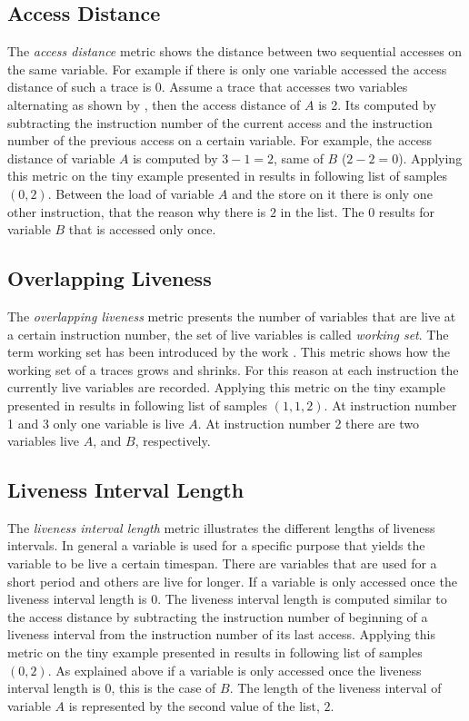 \documentclass[onecolumn, openright, master, english, signatures]{dbrgrptt}
\begin{document}
\subsection{Access Distance}\label{ssec:metric-access-distance}
The \emph{access distance} metric shows the distance between two sequential accesses on the same variable.
For example if there is only one variable accessed the access distance of such a \ac{trace} is 0.
Assume a \ac{trace} that accesses two variables alternating as shown by , then the access distance of $A$ is 2.
Its computed by subtracting the instruction number of the current access and the instruction number of the previous access on a certain variable.
For example, the access distance of variable $A$ is computed by $3-1 = 2$, same of $B$ ($2 - 2 = 0$).
Applying this metric on the tiny example presented in  results in following list of samples $(0, 2)$.
Between the load of variable $A$ and the store on it there is only one other instruction, that the reason why there is $2$ in the list.
The $0$ results for variable $B$ that is accessed only once.

\subsection{Overlapping Liveness}\label{ssec:metric-concurrently-live}
The \emph{overlapping liveness} metric presents the number of variables that are live at a certain instruction number, the set of live variables is called \emph{working set}.
The term working set has been introduced by the work \cite{denning1968working}.
This metric shows how the working set of a \ac{trace}s grows and shrinks.
For this reason at each instruction the currently live variables are recorded.
Applying this metric on the tiny example presented in  results in following list of samples $(1, 1, 2)$.
At instruction number 1 and 3 only one variable is live $A$.
At instruction number 2 there are two variables live $A$, and $B$, respectively.

\subsection{Liveness Interval Length}\label{ssec:metric-liveness-interval-length}
The \emph{liveness interval length} metric illustrates the different lengths of liveness intervals.
In general a variable is used for a specific purpose that yields the variable to be live a certain timespan.
There are variables that are used for a short period and others are live for longer.
If a variable is only accessed once the liveness interval length is $0$.
The liveness interval length is computed similar to the access distance by subtracting the instruction number of beginning of a liveness interval from the instruction number of its last access.
Applying this metric on the tiny example presented in  results in following list of samples $(0, 2)$.
As explained above if a variable is only accessed once the liveness interval length is $0$, this is the case of $B$.
The length of the liveness interval of variable $A$ is represented by the second value of the list, $2$.
\end{document}
